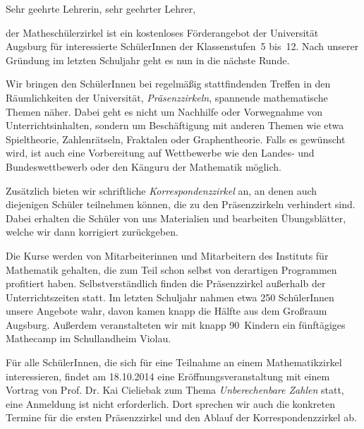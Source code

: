 \documentclass{zirkelbrief}
\begin{document}
\renewcommand{\anschrift}{%
      Holbein-Gymnasium Augsburg \\
      Fachbereich Mathematik \\
      Hallstraße 10 \\
      86150 Augsburg}
\renewcommand{\datum}{\today}
\renewcommand{\betreff}{Matheschülerzirkel der Universität Augsburg}

\makeletterhead

Sehr geehrte Lehrerin, sehr geehrter Lehrer,

der Matheschülerzirkel ist ein kostenloses Förderangebot der Universität Augsburg für interessierte SchülerInnen
der Klassenstufen~5 bis~12. Nach unserer Gründung im letzten Schuljahr geht es nun in die nächste Runde.

Wir bringen den SchülerInnen bei regelmäßig stattfindenden Treffen in
den Räumlichkeiten der Universität, \emph{Präsenzzirkeln}, spannende mathematische Themen
näher. Dabei geht es nicht um Nachhilfe oder Vorwegnahme von
Unterrichtsinhalten, sondern um Beschäftigung mit anderen Themen wie etwa
Spieltheorie, Zahlenrätseln, Fraktalen oder Graphentheorie. Falls es gewünscht
wird, ist auch eine Vorbereitung auf Wettbewerbe wie den Landes- und
Bundeswettbewerb oder den Känguru der Mathematik möglich.

Zusätzlich bieten wir schriftliche \emph{Korrespondenzzirkel} an, an denen auch diejenigen Schüler teilnehmen können, die zu den Präsenzzirkeln verhindert sind. Dabei erhalten die Schüler von uns
Materialien und bearbeiten Übungsblätter, welche wir dann korrigiert zurückgeben.

Die Kurse werden von Mitarbeiterinnen und Mitarbeitern des Instituts für
Mathematik gehalten, die zum Teil schon selbst von derartigen Programmen
profitiert haben. Selbstverständlich finden die Präsenzzirkel
außerhalb der Unterrichtszeiten statt.
Im letzten Schuljahr nahmen etwa 250 SchülerInnen unsere
Angebote wahr, davon kamen knapp die Hälfte aus dem Großraum Augsburg. Außerdem veranstalteten wir mit knapp 90~Kindern ein fünftägiges Mathecamp im Schullandheim Violau.

Für alle SchülerInnen, die sich für eine Teilnahme an einem Mathematikzirkel
interessieren, findet am 18.10.2014 eine Eröffnungsveranstaltung mit einem Vortrag von
Prof. Dr. Kai Cieliebak zum Thema \emph{Unberechenbare Zahlen}
statt, eine
Anmeldung ist nicht erforderlich. Dort sprechen wir auch die konkreten Termine für die
ersten Präsenzzirkel und den Ablauf der Korrespondenzzirkel ab.
\end{document}
